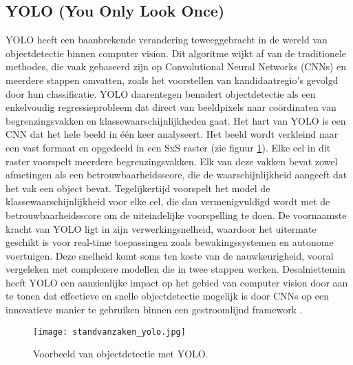 \subsection{YOLO (You Only Look Once)}
YOLO heeft een baanbrekende verandering teweeggebracht in de wereld van objectdetectie binnen computer vision. Dit algoritme wijkt af van de traditionele methodes, die vaak gebaseerd zijn op Convolutional Neural Networks (CNNs) en meerdere stappen omvatten, zoals het voorstellen van kandidaatregio's gevolgd door hun classificatie. YOLO daarentegen benadert objectdetectie als een enkelvoudig regressieprobleem dat direct van beeldpixels naar coördinaten van begrenzingsvakken en klassewaarschijnlijkheden gaat.
\newline
Het hart van YOLO is een CNN dat het hele beeld in één keer analyseert. Het beeld wordt verkleind naar een vast formaat en opgedeeld in een SxS raster (zie figuur \ref{fig:standvanzaken_yolo}). Elke cel in dit raster voorspelt meerdere begrenzingsvakken. Elk van deze vakken bevat zowel afmetingen als een betrouwbaarheidsscore, die de waarschijnlijkheid aangeeft dat het vak een object bevat. Tegelijkertijd voorspelt het model de klassewaarschijnlijkheid voor elke cel, die dan vermenigvuldigd wordt met de betrouwbaarheidsscore om de uiteindelijke voorspelling te doen.
\newline
De voornaamste kracht van YOLO ligt in zijn verwerkingsnelheid, waardoor het uitermate geschikt is voor real-time toepassingen zoals bewakingssystemen en autonome voertuigen. Deze snelheid komt soms ten koste van de nauwkeurigheid, vooral vergeleken met complexere modellen die in twee stappen werken. Desalniettemin heeft YOLO een aanzienlijke impact op het gebied van computer vision door aan te tonen dat effectieve en snelle objectdetectie mogelijk is door CNNs op een innovatieve manier te gebruiken binnen een gestroomlijnd framework \autocite{diwan2023object}.
\newline
\begin{figure}[H]
  \centering
  \texttt{[image: standvanzaken\_yolo.jpg]}
  \caption{Voorbeeld van objectdetectie met YOLO. \cite{springer_image}}
  \label{fig:standvanzaken_yolo}  
\end{figure}
\newline
